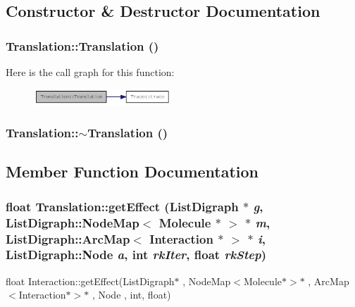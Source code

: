 \subsection{Constructor \& Destructor Documentation}
\hypertarget{classTranslation_a19a6742a807888b66b0a402469bbf588}{
\subsubsection[{Translation}]{\setlength{\rightskip}{0pt plus 5cm}Translation::Translation ()}}
\label{classTranslation_a19a6742a807888b66b0a402469bbf588}


Here is the call graph for this function:\nopagebreak
\begin{figure}[H]
\begin{center}
\leavevmode
\includegraphics[width=146pt]{classTranslation_a19a6742a807888b66b0a402469bbf588_cgraph}
\end{center}
\end{figure}
\hypertarget{classTranslation_ab6843356b4ba3234408b6a6024f0a5f1}{
\subsubsection[{$\sim$Translation}]{\setlength{\rightskip}{0pt plus 5cm}Translation::$\sim$Translation ()}}
\label{classTranslation_ab6843356b4ba3234408b6a6024f0a5f1}


\subsection{Member Function Documentation}
\hypertarget{classTranslation_a6599a0f28a58b5adf122d8b8c6206061}{
\subsubsection[{getEffect}]{\setlength{\rightskip}{0pt plus 5cm}float Translation::getEffect (ListDigraph $\ast$ {\em g}, \/  ListDigraph::NodeMap$<$ {\bf Molecule} $\ast$ $>$ $\ast$ {\em m}, \/  ListDigraph::ArcMap$<$ {\bf Interaction} $\ast$ $>$ $\ast$ {\em i}, \/  ListDigraph::Node {\em a}, \/  int {\em rkIter}, \/  float {\em rkStep})}}
\label{classTranslation_a6599a0f28a58b5adf122d8b8c6206061}
float Interaction::getEffect(ListDigraph$\ast$ , NodeMap$<$Molecule$\ast$$>$$\ast$ , ArcMap$<$Interaction$\ast$$>$$\ast$ , Node , int, float)

